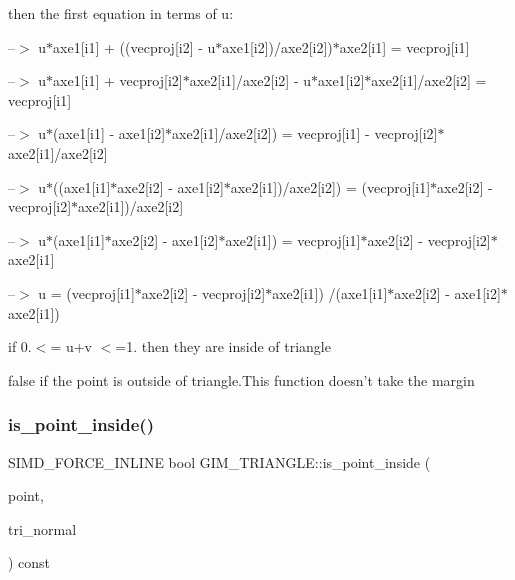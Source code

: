then the first equation in terms of \textquotesingle{}u\textquotesingle{}\+:

--$>$ u$\ast$axe1\mbox{[}i1\mbox{]} + ((vecproj\mbox{[}i2\mbox{]} -\/ u$\ast$axe1\mbox{[}i2\mbox{]})/axe2\mbox{[}i2\mbox{]})$\ast$axe2\mbox{[}i1\mbox{]} = vecproj\mbox{[}i1\mbox{]}

--$>$ u$\ast$axe1\mbox{[}i1\mbox{]} + vecproj\mbox{[}i2\mbox{]}$\ast$axe2\mbox{[}i1\mbox{]}/axe2\mbox{[}i2\mbox{]} -\/ u$\ast$axe1\mbox{[}i2\mbox{]}$\ast$axe2\mbox{[}i1\mbox{]}/axe2\mbox{[}i2\mbox{]} = vecproj\mbox{[}i1\mbox{]}

--$>$ u$\ast$(axe1\mbox{[}i1\mbox{]} -\/ axe1\mbox{[}i2\mbox{]}$\ast$axe2\mbox{[}i1\mbox{]}/axe2\mbox{[}i2\mbox{]}) = vecproj\mbox{[}i1\mbox{]} -\/ vecproj\mbox{[}i2\mbox{]}$\ast$axe2\mbox{[}i1\mbox{]}/axe2\mbox{[}i2\mbox{]}

--$>$ u$\ast$((axe1\mbox{[}i1\mbox{]}$\ast$axe2\mbox{[}i2\mbox{]} -\/ axe1\mbox{[}i2\mbox{]}$\ast$axe2\mbox{[}i1\mbox{]})/axe2\mbox{[}i2\mbox{]}) = (vecproj\mbox{[}i1\mbox{]}$\ast$axe2\mbox{[}i2\mbox{]} -\/ vecproj\mbox{[}i2\mbox{]}$\ast$axe2\mbox{[}i1\mbox{]})/axe2\mbox{[}i2\mbox{]}

--$>$ u$\ast$(axe1\mbox{[}i1\mbox{]}$\ast$axe2\mbox{[}i2\mbox{]} -\/ axe1\mbox{[}i2\mbox{]}$\ast$axe2\mbox{[}i1\mbox{]}) = vecproj\mbox{[}i1\mbox{]}$\ast$axe2\mbox{[}i2\mbox{]} -\/ vecproj\mbox{[}i2\mbox{]}$\ast$axe2\mbox{[}i1\mbox{]}

--$>$ u = (vecproj\mbox{[}i1\mbox{]}$\ast$axe2\mbox{[}i2\mbox{]} -\/ vecproj\mbox{[}i2\mbox{]}$\ast$axe2\mbox{[}i1\mbox{]}) /(axe1\mbox{[}i1\mbox{]}$\ast$axe2\mbox{[}i2\mbox{]} -\/ axe1\mbox{[}i2\mbox{]}$\ast$axe2\mbox{[}i1\mbox{]})

if 0.$<$= u+v $<$=1. then they are inside of triangle \begin{DoxyVerb}\return false if the point is outside of triangle.This function  doesn't take the margin\end{DoxyVerb}
 \mbox{\label{classGIM__TRIANGLE_ac465430340164aa45925762d3471b5f8}} 
\subsubsection{\texorpdfstring{is\+\_\+point\+\_\+inside()}{is\_point\_inside()}\hspace{0.1cm}{\footnotesize\ttfamily [1/2]}}
{\footnotesize\ttfamily S\+I\+M\+D\+\_\+\+F\+O\+R\+C\+E\+\_\+\+I\+N\+L\+I\+NE bool G\+I\+M\+\_\+\+T\+R\+I\+A\+N\+G\+L\+E\+::is\+\_\+point\+\_\+inside (\begin{DoxyParamCaption}\item[{const bt\+Vector3 \&}]{point,  }\item[{const bt\+Vector3 \&}]{tri\+\_\+normal }\end{DoxyParamCaption}) const\hspace{0.3cm}{\ttfamily [inline]}}



